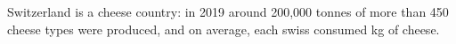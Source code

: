 Switzerland is a cheese country: in 2019 around 200,000 tonnes of more than 450 cheese types were produced, and on average, each swiss consumed \unit[20]{kg} of cheese.